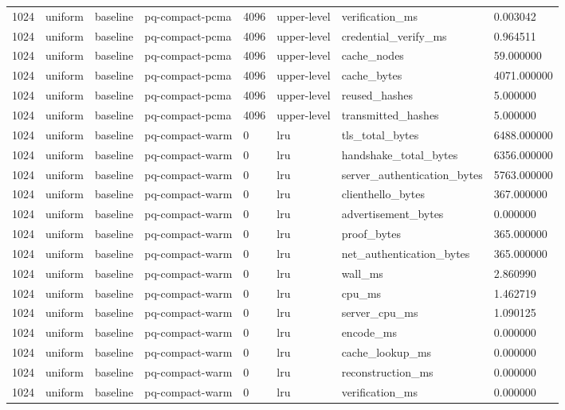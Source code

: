 \begin{tabular}{llllllll}
1024 & uniform & baseline & pq-compact-pcma & 4096 & upper-level & verification\_ms & 0.003042 \\
1024 & uniform & baseline & pq-compact-pcma & 4096 & upper-level & credential\_verify\_ms & 0.964511 \\
1024 & uniform & baseline & pq-compact-pcma & 4096 & upper-level & cache\_nodes & 59.000000 \\
1024 & uniform & baseline & pq-compact-pcma & 4096 & upper-level & cache\_bytes & 4071.000000 \\
1024 & uniform & baseline & pq-compact-pcma & 4096 & upper-level & reused\_hashes & 5.000000 \\
1024 & uniform & baseline & pq-compact-pcma & 4096 & upper-level & transmitted\_hashes & 5.000000 \\
1024 & uniform & baseline & pq-compact-warm & 0 & lru & tls\_total\_bytes & 6488.000000 \\
1024 & uniform & baseline & pq-compact-warm & 0 & lru & handshake\_total\_bytes & 6356.000000 \\
1024 & uniform & baseline & pq-compact-warm & 0 & lru & server\_authentication\_bytes & 5763.000000 \\
1024 & uniform & baseline & pq-compact-warm & 0 & lru & clienthello\_bytes & 367.000000 \\
1024 & uniform & baseline & pq-compact-warm & 0 & lru & advertisement\_bytes & 0.000000 \\
1024 & uniform & baseline & pq-compact-warm & 0 & lru & proof\_bytes & 365.000000 \\
1024 & uniform & baseline & pq-compact-warm & 0 & lru & net\_authentication\_bytes & 365.000000 \\
1024 & uniform & baseline & pq-compact-warm & 0 & lru & wall\_ms & 2.860990 \\
1024 & uniform & baseline & pq-compact-warm & 0 & lru & cpu\_ms & 1.462719 \\
1024 & uniform & baseline & pq-compact-warm & 0 & lru & server\_cpu\_ms & 1.090125 \\
1024 & uniform & baseline & pq-compact-warm & 0 & lru & encode\_ms & 0.000000 \\
1024 & uniform & baseline & pq-compact-warm & 0 & lru & cache\_lookup\_ms & 0.000000 \\
1024 & uniform & baseline & pq-compact-warm & 0 & lru & reconstruction\_ms & 0.000000 \\
1024 & uniform & baseline & pq-compact-warm & 0 & lru & verification\_ms & 0.000000 \\

\end{tabular}
